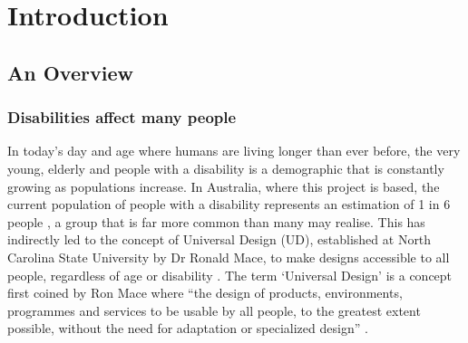 
\chapter{Introduction}\label{chapter:firstchapter} %

\label{Chapter1} %


\section{An Overview}\label{sec:firstsection} %

\subsection{Disabilities affect many people}
In today's day and age where humans are living longer than ever before, the very young, elderly and people with a disability is a demographic that is constantly growing as populations increase.
In Australia, where this project is based, the current population of people with a disability represents an estimation of 1 in 6 people \cite{ausstats}, a group that is far more common than many may realise.
This has indirectly led to the concept of Universal Design (UD), established at North Carolina State University by Dr Ronald Mace, to make designs accessible to all people, regardless of age or disability \cite{ronald}.
The term ‘Universal Design’ is a concept first coined by Ron Mace where “the design of products, environments, programmes and services to be usable by all people, to the greatest extent possible, without the need for adaptation or specialized design” \cite{nda}. 

